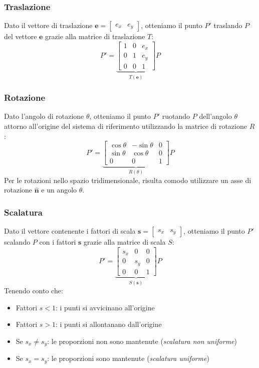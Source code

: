 \subsubsection{Traslazione}
Dato il vettore di traslazione $\mathbf{e} = \begin{bmatrix}e_x & e_y\end{bmatrix}$, otteniamo il punto $P'$ traslando $P$ del vettore $\mathbf{e}$ grazie alla matrice di traslazione $T$:
\[
P'
=
\underbrace{
    \begin{bmatrix}
        1 & 0 & e_x \\
        0 & 1 & e_y \\
        0 & 0 & 1
    \end{bmatrix}
}_{T(\mathbf{e})}
P
\]

\subsubsection{Rotazione}
Dato l'angolo di rotazione $\theta$, otteniamo il punto $P'$ ruotando $P$ dell'angolo $\theta$ attorno all'origine del sistema di riferimento utilizzando la matrice di rotazione $R$:
\[
P'
=
\underbrace{
    \begin{bmatrix}
        \cos{\theta} & -\sin{\theta} & 0 \\
        \sin{\theta} & \cos{\theta} & 0 \\
        0 & 0 & 1
    \end{bmatrix}
}_{R(\theta)}
P
\]
Per le rotazioni nello spazio tridimensionale, risulta comodo utilizzare un asse di rotazione $\hat{\mathbf{n}}$ e un angolo $\theta$.

\subsubsection{Scalatura}
Dato il vettore contenente i fattori di scala $\mathbf{s} = \begin{bmatrix}s_x & s_y\end{bmatrix}$, otteniamo il punto $P'$ scalando $P$ con i fattori $\mathbf{s}$ grazie alla matrice di scala $S$:
\[
P'
=
\underbrace{
    \begin{bmatrix}
        s_x & 0 & 0 \\
        0 & s_y & 0 \\
        0 & 0 & 1
    \end{bmatrix}
}_{S(\mathbf{s})}
P
\]
Tenendo conto che:
\begin{itemize}
    \item Fattori $s < 1$: i punti si avvicinano all'origine
    \item Fattori $s > 1$: i punti si allontanano dall'origine
    \item Se $s_x \neq s_y$: le proporzioni non sono mantenute (\emph{scalatura non uniforme})
    \item Se $s_x = s_y$: le proporzioni sono mantenute (\emph{scalatura uniforme})
\end{itemize}

